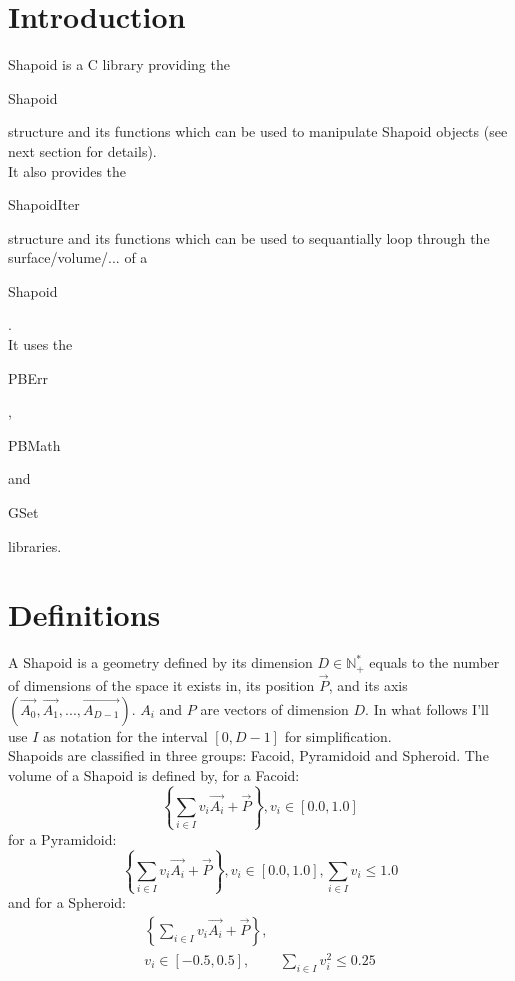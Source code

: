\section*{Introduction}

Shapoid is a C library providing the \begin{ttfamily}Shapoid\end{ttfamily} structure and its functions which can be used to manipulate Shapoid objects (see next section for details).\\

It also provides the \begin{ttfamily}ShapoidIter\end{ttfamily} structure and its functions which can be used to sequantially loop through the surface/volume/... of a \begin{ttfamily}Shapoid\end{ttfamily}.\\

It uses the \begin{ttfamily}PBErr\end{ttfamily}, \begin{ttfamily}PBMath\end{ttfamily} and \begin{ttfamily}GSet\end{ttfamily} libraries.\\

\section{Definitions}

A Shapoid is a geometry defined by its dimension $D\in\mathbb{N^*_+}$ equals to the number of dimensions of the space it exists in, its position $\overrightarrow{P}$, and its axis $(\overrightarrow{A_0},\overrightarrow{A_1},...,\overrightarrow{A_{D-1}})$. $A_i$ and $P$ are vectors of dimension $D$. In what follows I'll use $I$ as notation for the interval $[0,D-1]$ for simplification.\\

Shapoids are classified in three groups: Facoid, Pyramidoid and Spheroid. The volume of a Shapoid is defined by, for a Facoid: 
\begin{equation}
\left\lbrace \sum_{i\in I}v_i\overrightarrow{A_i}+\overrightarrow{P}\right\rbrace ,v_i\in[0.0,1.0]
\end{equation}
for a Pyramidoid:
\begin{equation}
\left\lbrace \sum_{i\in I}v_i\overrightarrow{A_i}+\overrightarrow{P}\right\rbrace ,v_i\in[0.0,1.0], \sum_{i\in I}v_i\le1.0
\end{equation}
and for a Spheroid:
\begin{equation}
\begin{array}{rl}
\left\lbrace \sum_{i\in I}v_i\overrightarrow{A_i}+\overrightarrow{P}\right\rbrace ,&\\
v_i\in[-0.5,0.5],&\sum_{i\in I}v_i^2\le0.25
\end{array}
\end{equation}

